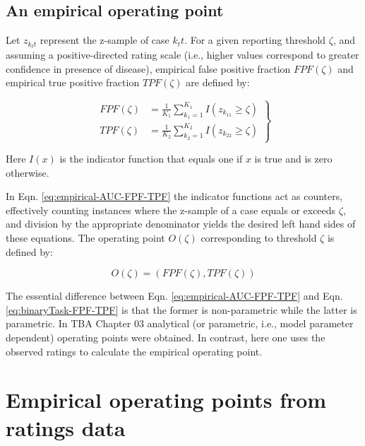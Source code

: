 \documentclass[
]{book}
\begin{document}
\hypertarget{an-empirical-operating-point}{%
\subsection{An empirical operating point}\label{an-empirical-operating-point}}

Let \(z_{k_tt}\) represent the z-sample of case \(k_tt\). For a given reporting threshold \(\zeta\), and assuming a positive-directed rating scale (i.e., higher values correspond to greater confidence in presence of disease), empirical false positive fraction \(FPF(\zeta)\) and empirical true positive fraction \(TPF(\zeta)\) are defined by:

\begin{equation}
\left.
\begin{aligned}
FPF\left ( \zeta \right ) &= \frac{1}{K_1}\sum_{k_1=1}^{K_1}I\left ( z_{k_11} \geq \zeta \right ) \\
TPF\left ( \zeta \right ) &= \frac{1}{K_2}\sum_{k_2=1}^{K_2}I\left ( z_{k_22} \geq \zeta \right )
\end{aligned}
\right \}
\label{eq:empirical-AUC-FPF-TPF}
\end{equation}

Here \(I(x)\) is the indicator function that equals one if \(x\) is true and is zero otherwise.

In Eqn. \eqref{eq:empirical-AUC-FPF-TPF} the indicator functions act as counters, effectively counting instances where the z-sample of a case equals or exceeds \(\zeta\), and division by the appropriate denominator yields the desired left hand sides of these equations. The operating point \(O(\zeta)\) corresponding to threshold \(\zeta\) is defined by:

\begin{equation}
O\left ( \zeta \right ) = \left ( FPF\left ( \zeta \right ), TPF\left ( \zeta \right ) \right )
\label{eq:empirical-OperatingPoint}
\end{equation}

The essential difference between Eqn. \eqref{eq:empirical-AUC-FPF-TPF} and Eqn. \eqref{eq:binaryTask-FPF-TPF} is that the former is non-parametric while the latter is parametric. In TBA Chapter 03 analytical (or parametric, i.e., model parameter dependent) operating points were obtained. In contrast, here one uses the observed ratings to calculate the empirical operating point.

\hypertarget{empirical-operating-points-from-ratings-data}{%
\section{Empirical operating points from ratings data}\label{empirical-operating-points-from-ratings-data}}
\end{document}
